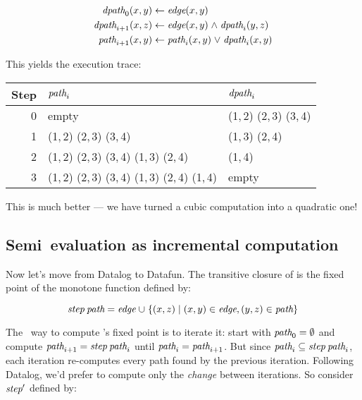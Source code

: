 \begin{align*}
  \name{dpath}_0(x,y) &\gets \name{edge}(x,y)
  \\
  \name{dpath}_{i+1}(x,z) &\gets \name{edge}(x,y) \wedge \name{dpath}_i(y,z)
  \\
  \name{path}_{i+1}(x,y) &\gets \name{path}_i(x,y) \vee \name{dpath}_i(x,y)
\end{align*}

\noindent This yields the execution trace:

\begin{center}
  \setlength\tabcolsep{1em}
  \begin{tabular}{@{}rll@{}}
    Step & $\text{\itshape path}_i$ & $\text{\itshape dpath}_i$
    \\\midrule
    0 & empty & (1,\,2) (2,\,3) (3,\,4)
    \\
    1 & (1,\,2) (2,\,3) (3,\,4) & (1,\,3) (2,\,4)
    \\
    2 & (1,\,2) (2,\,3) (3,\,4) (1,\,3) (2,\,4) & (1,\,4)
    \\
    3 & (1,\,2) (2,\,3) (3,\,4) (1,\,3) (2,\,4) (1,\,4) & empty
  \end{tabular}
\end{center}

This is much better --- we have turned a cubic computation into a quadratic one!


\subsection{Semi\naive\ evaluation as incremental computation}

Now let's move from Datalog to Datafun. The transitive closure of  is
the fixed point of the monotone function  defined by:

\nopagebreak[2]
\[
\name{step} \<\name{path} = \name{edge} \cup
\setfor{(x,z)}{(x,y) \in \name{edge}, (y,z) \in \name{path}}
\]

\noindent
The \naive\ way to compute 's fixed point is to iterate it: start
with \(\text{\itshape path}_0 = \emptyset\) and compute \(\name{path}_{i+1} =
\name{step}\<\name{path}_i\) until \(\text{\itshape path}_i = \text{\itshape path}_{i+1}\).
%
But since $\name{path}_i \subseteq \name{step}\<\name{path}_i$, each iteration
re-computes every path found by the previous iteration.
%
Following Datalog, we'd prefer to compute only the \emph{change} between
iterations.
%
So consider $\text{\itshape step}'$ defined by:

